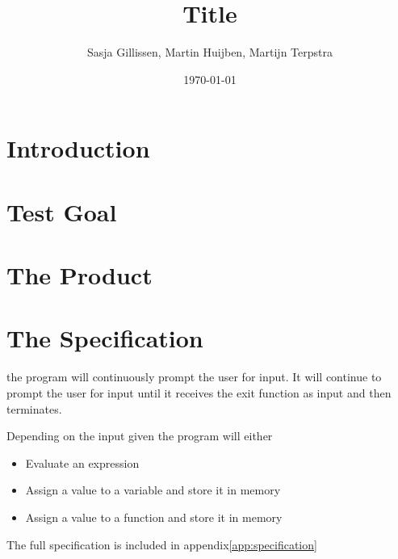 \documentclass[11pt,a4paper]{article}
\author{Sasja Gillissen, Martin Huijben, Martijn Terpstra}
\date{\today}
\title{Title}
\begin{document}
\maketitle

\section{Introduction}


\section{Test Goal}


\section{The Product}


\section{The Specification}

the program will continuously prompt the user for input. It will
continue to prompt the user for input until it receives the exit
function as input and then terminates.

Depending on the input given the program will either

\begin{itemize}
\item Evaluate an expression
\item Assign a value to a variable and store it in memory
\item Assign a value to a function and store it in memory
\end{itemize}
The full specification is included in appendix\ref{app:specification}

\end{document}
